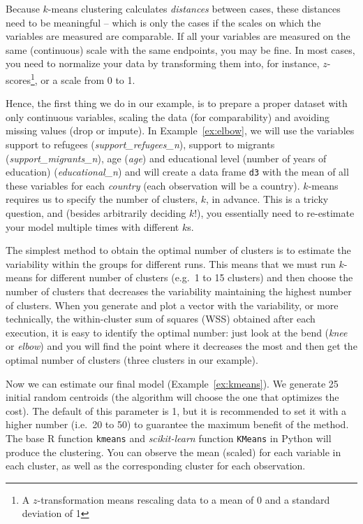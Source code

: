 Because $k$-means clustering calculates \emph{distances} between cases,
these distances need to be meaningful -- which is only the cases if
the scales on which the variables are measured are comparable. If all
your variables are measured on the same (continuous) scale with the
same endpoints, you may be fine. In most cases, you need to normalize
your data by transforming them into, for instance, $z$-scores\footnote{A $z$-transformation means rescaling data to a mean of 0 and a standard deviation of 1}, or a
scale from 0 to 1.

Hence, the first thing we do in our example, is to prepare a proper
dataset with only continuous variables, scaling the data (for
comparability) and avoiding missing values (drop or impute). In
Example~\ref{ex:elbow}, we will use the variables support to refugees
(\emph{support\_refugees\_n}), support to
migrants (\emph{support\_migrants\_n}), age (\emph{age}) and
educational level (number of years of education)
(\emph{educational\_n}) and will create a data frame \verb+d3+ with the
mean of all these variables for each \emph{country} (each observation
will be a country). $k$-means requires us to specify the number of
clusters, $k$, in advance. This is a tricky question, and (besides 
arbitrarily deciding $k$!), you essentially need to re-estimate your
model multiple times with different $k$s.

The simplest method to obtain the optimal number of clusters is to
estimate the variability within the groups for different runs. This
means that we must run $k$-means for different number of clusters
(e.g.\ 1 to 15 clusters) and then choose the number of clusters that
decreases the variability maintaining the highest number of
clusters. When you generate and plot a vector with the variability,
or more technically, the within-cluster sum of squares (WSS)
obtained after each execution, it is easy to identify the optimal
number: just look at the bend (\textit{knee} or \textit{elbow}) and
you will find the point where it decreases the most and then get the
optimal number of clusters (three clusters in our example).


Now we can estimate our final model (Example~\ref{ex:kmeans}). We generate 25
initial random centroids (the algorithm will choose the one that
optimizes the cost). The default of this parameter is 1, but it is
recommended to set it with a higher number (i.e.\ 20 to 50) to guarantee
the maximum benefit of the method. The base R function \texttt{kmeans} and
\emph{scikit-learn} function \texttt{KMeans} in Python will produce the
clustering. You can observe the mean (scaled) for each variable in
each cluster, as well as the corresponding cluster for each
observation.

